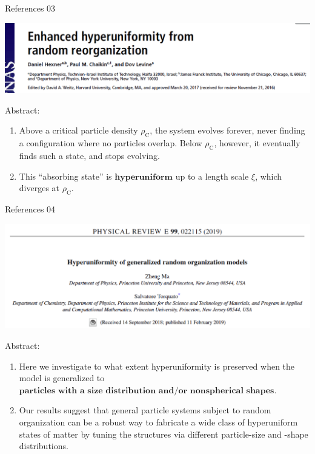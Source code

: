 \documentclass{bredelebeamer}
\begin{document}
\begin{frame}{References 03}
\centerline{\includegraphics[scale=0.2]{images/p3.png}}
Abstract:
\begin{enumerate}[]
\item Above a critical particle density $\rho_{\mathrm{C}}$, the
system evolves forever, never finding a configuration where no
particles overlap. Below $\rho_{\mathrm{C}}$, however, it eventually finds such a
state, and stops evolving. 
\item This “absorbing state” is $\textbf{hyperuniform}$
up to a length scale $\xi$, which diverges at $\rho_{\mathrm{C}}$.
\end{enumerate}
\end{frame}

\begin{frame}{References 04}
\centerline{\includegraphics[scale=0.2]{images/p4.png}}
Abstract:
\begin{enumerate}[]
\item Here we investigate to what extent hyperuniformity is preserved when the model is generalized to $\textbf{particles with a size distribution and/or nonspherical shapes}$.
\item Our results suggest that general particle systems subject to random organization can be a robust way to fabricate a wide class of hyperuniform states of matter by tuning the structures via different particle-size and -shape distributions.
\end{enumerate}
\end{frame}
\end{document}
